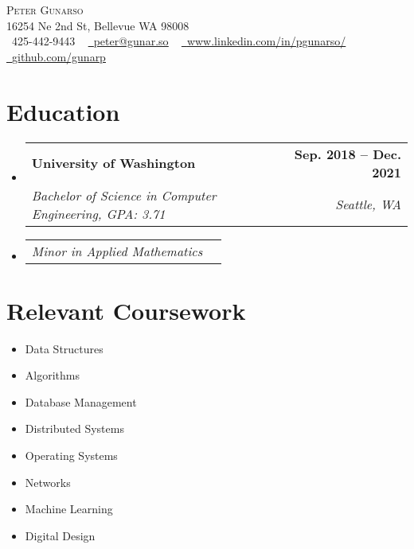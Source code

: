 \documentclass[letterpaper,11pt]{article}
\makeatletter
\newcommand{\resumeSubheading}[4]{
  \vspace{-2pt}\item
    \begin{tabular*}{1.0\textwidth}[t]{l@{\extracolsep{\fill}}r}
      \textbf{#1} & \textbf{\small #2} \\
      \textit{\small#3} & \textit{\small #4} \\
    \end{tabular*}\vspace{-7pt}
}
\newcommand{\resumeSubSubheading}[2]{
    \item
    \begin{tabular*}{0.97\textwidth}{l@{\extracolsep{\fill}}r}
      \textit{\small#1} & \textit{\small #2} \\
    \end{tabular*}\vspace{-7pt}
}
\newcommand{\resumeSubHeadingListStart}{\begin{itemize}[leftmargin=0.0in, label={}]}
\newcommand{\resumeSubHeadingListEnd}{\end{itemize}}
\makeatother
\begin{document}

\begin{center}
    {\Huge \scshape Peter Gunarso} \\ \vspace{1pt}
    16254 Ne 2nd St, Bellevue WA 98008 \\ \vspace{1pt}
    \small \raisebox{-0.1\height}\faPhone\ 425-442-9443 ~ \href{mailto:peter@gunar.so}{\raisebox{-0.2\height}\faEnvelope\  \underline{peter@gunar.so}} ~
    \href{https://www.linkedin.com/in/pgunarso/}{\raisebox{-0.2\height}\faLinkedin\ \underline{www.linkedin.com/in/pgunarso/}}  ~
    \href{https://github.com/gunarp}{\raisebox{-0.2\height}\faGithub\ \underline{github.com/gunarp}}
    \vspace{-8pt}
\end{center}


\section{Education}
  \resumeSubHeadingListStart
    \resumeSubheading
      {University of Washington}{Sep. 2018 -- Dec. 2021}
      {Bachelor of Science in Computer Engineering, GPA: 3.71}{Seattle, WA}
    \resumeSubSubheading
      {Minor in Applied Mathematics}{}
  \resumeSubHeadingListEnd

\section{Relevant Coursework}
        \begin{multicols}{4}
            \begin{itemize}[itemsep=-5pt, parsep=3pt]
                \item\small Data Structures
                \item Algorithms
                \item Database Management
                \item Distributed Systems
                \item Operating Systems
                \item Networks
                \item Machine Learning
                \item Digital Design
            \end{itemize}
        \end{multicols}
        \vspace*{2.0\multicolsep}
\end{document}
